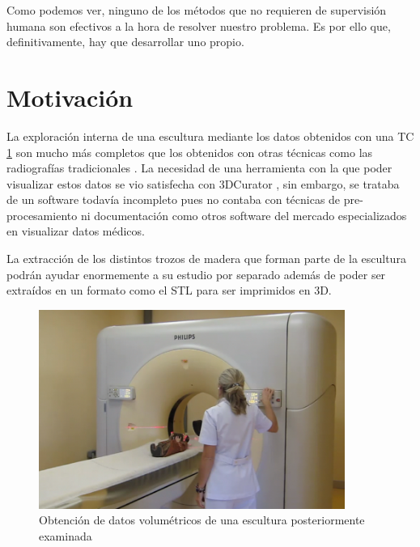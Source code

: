 Como podemos ver, ninguno de los métodos que no requieren de supervisión humana son efectivos a la hora de resolver nuestro problema. Es por ello que, definitivamente, hay que desarrollar uno propio.

\section{Motivación}

La exploración interna de una escultura mediante los datos obtenidos con una TC \ref{fig:introduccion/ct-scan} son mucho más completos que los obtenidos con otras técnicas como las radiografías tradicionales \cite{sarrio16}. La necesidad de una herramienta con la que poder visualizar estos datos se vio satisfecha con 3DCurator \cite{bolivar16}, sin embargo, se trataba de un software todavía incompleto pues no contaba con técnicas de pre-procesamiento ni documentación como otros software del mercado especializados en visualizar datos médicos.

La extracción de los distintos trozos de madera que forman parte de la escultura podrán ayudar enormemente a su estudio por separado además de poder ser extraídos en un formato como el STL para ser imprimidos en 3D.

\begin{figure}[H]
	\centering
	\includegraphics[width=10cm]{imagenes/introduccion/ct-scan}
	\caption{Obtención de datos volumétricos de una escultura posteriormente examinada}
	\label{fig:introduccion/ct-scan}
\end{figure}